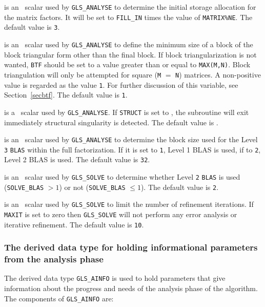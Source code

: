\documentclass{galahad}
\newcommand{\packagename}{GLS}
\begin{document}
\begin{description}
 is an \integer\ scalar used by {\tt \packagename\_ANALYSE}
to determine the
initial storage allocation for the matrix factors.  It will be set to
{\tt FILL\_IN} times the value of {\tt MATRIX\%NE}.
The default value is {\tt 3}.

 is an \integer\ scalar used by {\tt \packagename\_ANALYSE} to define
the minimum size of a block of the block triangular form
other than the final block.  If block triangularization is not wanted,
{\tt BTF} should be set to a value greater than or equal to
{\tt MAX(M,N)}. Block triangulation will only be attempted for square
({\tt M} $=$ {\tt N}) matrices.
A non-positive value is regarded as the value {\tt 1}.  For further
discussion of this variable, see Section~\ref{secbtf}.
The default value is {\tt 1}.

 is a \logical\ scalar used by
{\tt \packagename\_ANALYSE}. If {\tt STRUCT} is
set to \true, the subroutine will exit immediately structural
singularity is detected.  The default value is \false.

 is an \integer\ scalar used by
{\tt \packagename\_ANALYSE} to determine
the block size used for the Level {\tt 3} {\tt BLAS} within the full
factorization.  If it is set to {\tt 1}, Level 1 BLAS is used, if to {\tt 2},
Level 2 BLAS is used.  The default value is {\tt 32}.

 is an \integer\ scalar used by {\tt \packagename\_SOLVE} to
determine whether Level {\tt 2} {\tt BLAS} is used ({\tt SOLVE\_BLAS}
$> 1$) or not ({\tt SOLVE\_BLAS} $\leq 1$). The default value is {\tt 2}.

 is an \integer\ scalar used by {\tt \packagename\_SOLVE} to limit
the number of refinement iterations.  If {\tt MAXIT} is set to zero then
{\tt \packagename\_SOLVE} will not perform any error analysis or
iterative refinement.
The default value is {\tt 10}.
\end{description}


\subsubsection{The derived data type for holding informational
 parameters from the analysis phase}\label{typeinforma}
The derived data type
{\tt \packagename\_AINFO}
is used to hold parameters that give information about the progress and needs
of the analysis phase of the algorithm. The components of
{\tt \packagename\_AINFO}
are:
\end{document}
